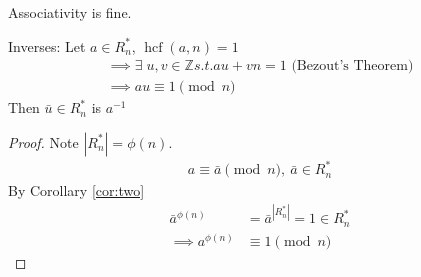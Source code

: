 Associativity is fine.

Inverses: Let \(a \in R_n^*\), \(\operatorname{hcf}(a, n) = 1\)
\begin{align*}
    \implies \exists \; u, v \in \mathbb{Z} s.t. a u + v n = 1 \text{ (Bezout's Theorem)} \\
    \implies au \equiv 1 \pmod n
\end{align*}
Then \(\bar{u} \in R_n^*\) is \(a^{-1}\)

\begin{proof}
Note \(|R_n^*| = \phi(n)\).
\begin{align*}
    a \equiv \bar{a} \pmod n,\ \bar{a} \in R_n^*
\end{align*}
By Corollary \ref{cor:two}
\begin{align*}
    \bar{a}^{\phi(n)} &= \bar{a}^{|R_n^*|} = 1 \in R_n^* \\
    \implies a^{\phi(n)} &\equiv 1 \pmod n
\end{align*}
\end{proof}
